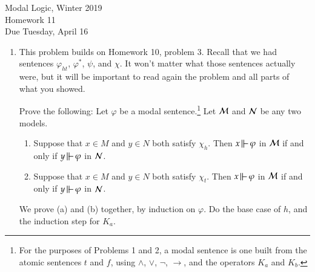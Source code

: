 \documentclass[11pt]{article}
\newcommand{\forces}{\,\mbox{$\mathrel\|\mathrel{\mkern-9mu}-\,$}}
\renewcommand{\phi}{\varphi}
\newcommand{\rem}[1]{\relax}
\newcommand{\iif}{\rightarrow}
\newcommand{\andd}{\wedge}
\newcommand{\orr}{\vee}
\newcommand{\nott}{\neg}
\newcommand{\abovearrow}[1]{\rightarrow\hspace{-.17in}\raisebox{1.0ex}
{$\scriptscriptstyle{#1}$}\hspace{.1in}}
\newcommand{\arrowa}{\,\lower1pt\hbox{$\abovearrow{a}$}}
\renewcommand{\diamond}{\diamondsuit}
\begin{document}
 \newcommand{\sw}{*}
 
\begin{center}
{
\Large  Modal Logic, Winter 2019   \\
Homework 11\\
Due Tuesday,  April 16\\
}
\end{center}
\newcommand{\heads}{h}
\newcommand{\tails}{t}
\newcommand{\Heads}{h}
\newcommand{\Tails}{t}
\newcommand{\Model}{{\cal M}}
\newcommand{\Nodel}{{\cal N}}
\newcommand{\Pub}{\relax}
\begin{enumerate}


\item This problem builds on Homework 10, problem 3.
Recall that we had sentences $\phi_{ht}$, $\phi^*$, $\psi$, and $\chi$.
It won't matter what those sentences actually were, but it will be important to read again the problem and all parts of what you showed.
\rem{
 $$\begin{array}{lcl}
 \phi_{ht} &  &  \Heads\oplus\Tails = (\Heads\orr\Tails) \andd\nott (\Heads\andd\Tails) \\
  \phi^*&  & ((\heads\andd K_a \heads \andd P_a \heads)\orr (\tails \andd K_a \tails \andd P_a \tails))
   \andd\ \nott K_b\, \heads\
 \andd \ \nott K_b\, \tails\\

 \psi & & \phi_{ht} \andd \phi^* \andd CK_{a,b}(\phi_{ht}\andd\phi^*)  \\
 \chi_{\Heads} & & \Heads \andd \psi \\
 \chi_{\Tails} & & \Tails \andd \psi \\
 \end{array}
 $$
 Here, $P\phi$ is the ``$\diamond$ version of $K$''.
 That is, $P_a\Heads$ is an abbreviation of $\nott K_a \nott\Heads$.
 And for all $z$, $z\models P_a\Heads$ if there is some $w$ such that $z\arrowa w$ and $w\models\Heads$.
} 
 
 Prove the following: Let $\phi$ be a modal sentence.\footnote{For the purposes of Problems 1 and 2,
 a modal sentence is one built from the atomic sentences $t$ and $f$, using $\andd$, $\orr$, $\nott$, $\iif$, and
 the operators $K_a$ and $K_b$.}
 Let $\Model$ and $\Nodel$ be any two models.
 \begin{enumerate}
 \item Suppose that $x\in M$ and $y\in N$ both satisfy $ \chi_h$.
 Then $x\forces \phi$ in $\Model$ if and only if $y\forces \phi$ in $\Nodel$.
\item Suppose that $x\in M$ and $y\in N$ both satisfy $ \chi_t$.
 Then $x\forces \phi$ in $\Model$ if and only if $y\forces \phi$ in $\Nodel$.
\end{enumerate}
We prove (a) and (b) together,   by induction on $\phi$.   Do the base case of $h$, and the induction step for $K_a$.


\end{enumerate}
\end{document}

